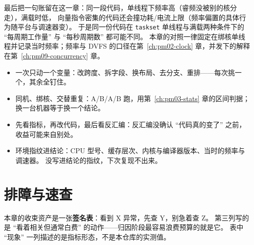 \documentclass[12pt,a4paper,fontset=fandol]{ctexbook}
\newcommand{\Tp}[1]{\texttt{#1}}
\begin{document}
最后把一句账留在这一章：同一段代码，单线程下频率高（睿频没被别的核分走），满载时低，
向量指令密集的代码还会撞功耗/电流上限（频率偏置的具体行为随平台与调速器变）。
于是同一份代码在 \Tp{taskset} 单线程与满载两种条件下的 ``每周期工作量'' 与 ``每秒周期数'' 都可能不同。
本章的对照一律固定在绑核单线程并记录当时频率；频率与 DVFS 的口径在第~\ref{ch:pm02-clock} 章，并发下的解释在第~\ref{ch:pm09-concurrency} 章。

\begin{bestpractice}[title={本章归因四步起手式},label={box:pm06-start}]
\begin{itemize}
\item 一次只动一个变量：改跨度、拆字段、换布局、去分支、重排——每次挑一个，其余全钉住。
\item 同机、绑核、交替重复：A/B/A/B 跑，用第~\ref{ch:pm03-stats} 章的区间判据；换一台机器等于换一个结论。
\item 先看指标，再改代码，最后看反汇编：反汇编没确认 ``代码真的变了'' 之前，收益可能来自别处。
\item 环境指纹进结论：CPU 型号、缓存层次、内核与编译器版本、当时的频率与调速器。
  没写进结论的指纹，下次复现不出来。
\end{itemize}
\end{bestpractice}

\section{排障与速查}
\label{sec:pm06-signature}

本章的收束资产是一张\textbf{签名表}：看到 X 异常，先查 Y，别急着查 Z。
第三列写的是 ``看着相关但通常白费'' 的动作——归因阶段最容易浪费预算的就是它。
表中 ``现象'' 一列描述的是指标形态，不是本仓库的实测值。
\end{document}
